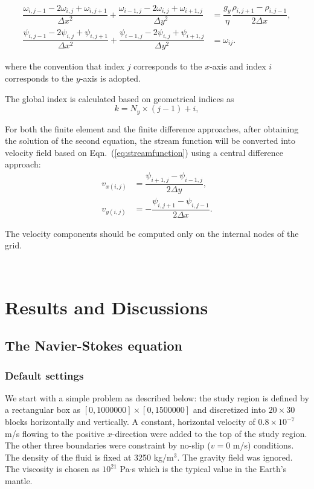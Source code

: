 \documentclass[12pt]{article}
\numberwithin{figure}{section}  %
\numberwithin{equation}{section}  %
\begin{document}
\begin{align*}
    \dfrac{\omega_{i,j-1}-2\omega_{i,j}+\omega_{i,j+1}}{\Delta{x}^2} + \dfrac{\omega_{i-1,j}-2\omega_{i,j}+\omega_{i+1,j}}{\Delta{y}^2} &= \dfrac{g_y}{\eta}\dfrac{\rho_{i,j+1}-\rho_{i,j-1}}{2\Delta{x}}, \\
    \dfrac{\psi_{i,j-1}-2\psi_{i,j}+\psi_{i,j+1}}{\Delta{x}^2} + \dfrac{\psi_{i-1,j}-2\psi_{i,j}+\psi_{i+1,j}}{\Delta{y}^2} &= \omega_{ij}.
\end{align*}
\begin{multicols}{2}
where the convention that index $j$ corresponds to the $x$-axis and index $i$ corresponds to the $y$-axis is adopted.

The global index is calculated based on geometrical indices as
\begin{equation}
    k = N_y\times(j-1)+i,
\end{equation}

For both the finite element and the finite difference approaches, after obtaining the solution of the second equation, the stream function will be converted into velocity field based on Eqn.\ (\ref{eq:streamfunction}) using a central difference approach:
\begin{align*}
    v_{x(i,j)} &= \dfrac{\psi_{i+1,j}-\psi_{i-1,j}}{2\Delta{y}}, \\
    v_{y(i,j)} &= -\dfrac{\psi_{i,j+1}-\psi_{i,j-1}}{2\Delta{x}}.
\end{align*}

The velocity components should be computed only on the internal nodes of the grid.

~\\

\section{Results and Discussions}

\subsection{The Navier-Stokes equation}

\subsubsection{Default settings}

We start with a simple problem as described below: the study region is defined by a rectangular box as $[0,1000000]\times[0,1500000]$ and discretized into $20\times30$ blocks horizontally and vertically. A constant, horizontal velocity of $0.8\times10^{-7}$ m/s flowing to the positive $x$-direction were added to the top of the study region. The other three boundaries were constraint by no-slip ($v=0$ m/s) conditions. The density of the fluid is fixed at 3250 kg/m$^3$. The gravity field was ignored. The viscosity is chosen as $10^{21}$ Pa$\cdot$s which is the typical value in the Earth's mantle.


\end{multicols}
\end{document}
